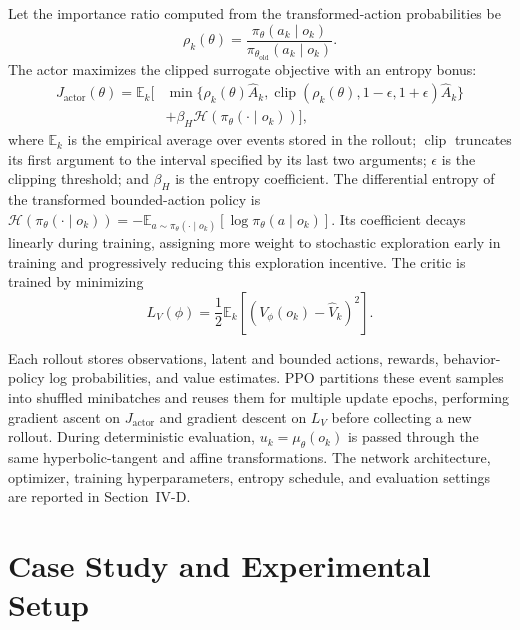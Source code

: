 \documentclass[conference]{IEEEtran}
\begin{document}
Let the importance ratio computed from the transformed-action probabilities be
\begin{equation}
 \rho_k(\theta)=
 \frac{\pi_\theta(a_k\mid o_k)}
 {\pi_{\theta_{\mathrm{old}}}(a_k\mid o_k)}.
\end{equation}
The actor maximizes the clipped surrogate objective with an entropy bonus:
\begin{align}
 J_{\mathrm{actor}}(\theta)=\mathbb{E}_k\big[&
 \min\{\rho_k(\theta)\widehat{A}_k,
 \operatorname{clip}(\rho_k(\theta),1-\epsilon,1+\epsilon)
 \widehat{A}_k\}\nonumber\\
 &+\beta_H\mathcal{H}(\pi_\theta(\cdot\mid o_k))\big],
\end{align}
where $\mathbb{E}_k$ is the empirical average over events stored in the rollout; $\operatorname{clip}$ truncates its first argument to the interval specified by its last two arguments; $\epsilon$ is the clipping threshold; and $\beta_H$ is the entropy coefficient. The differential entropy of the transformed bounded-action policy is $\mathcal{H}(\pi_\theta(\cdot\mid o_k))=-\mathbb{E}_{a\sim\pi_\theta(\cdot\mid o_k)}[\log\pi_\theta(a\mid o_k)]$. Its coefficient decays linearly during training, assigning more weight to stochastic exploration early in training and progressively reducing this exploration incentive. The critic is trained by minimizing
\begin{equation}
 L_V(\phi)=\frac{1}{2}\mathbb{E}_k
 \left[\left(V_\phi(o_k)-\widehat{V}_k\right)^2\right].
\end{equation}

Each rollout stores observations, latent and bounded actions, rewards, behavior-policy log probabilities, and value estimates. PPO partitions these event samples into shuffled minibatches and reuses them for multiple update epochs, performing gradient ascent on $J_{\mathrm{actor}}$ and gradient descent on $L_V$ before collecting a new rollout. During deterministic evaluation, $u_k=\mu_\theta(o_k)$ is passed through the same hyperbolic-tangent and affine transformations. The network architecture, optimizer, training hyperparameters, entropy schedule, and evaluation settings are reported in Section~IV-D.

\section{Case Study and Experimental Setup}
\end{document}
